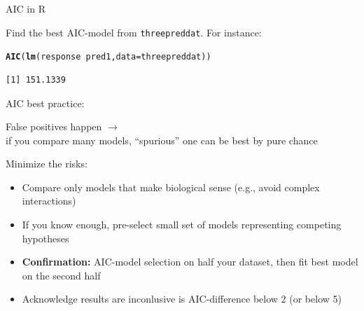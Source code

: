 \documentclass[10pt]{beamer}\usepackage[]{graphicx}\usepackage[]{color}
\makeatletter
\newcommand{\hlopt}[1]{\textcolor[rgb]{0,0,0}{#1}}%
\newcommand{\hlstd}[1]{\textcolor[rgb]{0.345,0.345,0.345}{#1}}%
\newcommand{\hlkwc}[1]{\textcolor[rgb]{0.333,0.667,0.333}{#1}}%
\newcommand{\hlkwd}[1]{\textcolor[rgb]{0.737,0.353,0.396}{\textbf{#1}}}%
\newenvironment{kframe}{%
 \def\at@end@of@kframe{}%
 \ifinner\ifhmode%
  \def\at@end@of@kframe{\end{minipage}}%
  \begin{minipage}{\columnwidth}%
 \fi\fi%
 \def\FrameCommand##1{\hskip\@totalleftmargin \hskip-\fboxsep
 \colorbox{shadecolor}{##1}\hskip-\fboxsep
     \hskip-\linewidth \hskip-\@totalleftmargin \hskip\columnwidth}%
 \MakeFramed {\advance\hsize-\width
   \@totalleftmargin\z@ \linewidth\hsize
   \@setminipage}}%
 {\par\unskip\endMakeFramed%
 \at@end@of@kframe}
\newenvironment{knitrout}{}{} %
\makeatother
\begin{document}
\begin{frame}[fragile]{AIC in R}

Find the best AIC-model from \texttt{threepreddat}. For instance:

\begin{knitrout}\small
{}\color{fgcolor}\begin{kframe}
\begin{alltt}
\hlkwd{AIC}\hlstd{(}\hlkwd{lm}\hlstd{(response} \hlopt{~} \hlstd{pred1,} \hlkwc{data} \hlstd{= threepreddat))}
\end{alltt}
\begin{verbatim}
[1] 151.1339
\end{verbatim}
\end{kframe}
\end{knitrout}

\end{frame}

\begin{frame}{AIC best practice:}
  
  False positives happen $\rightarrow$ \\ \hfill if you compare many models, ``spurious'' one can be best by pure chance
  
  \pause
  
  \begin{exampleblock}{Minimize the risks:}
  \begin{itemize}[<+->]
    \item Compare only models that make biological sense (e.g., avoid complex interactions)
    \item If you know enough, pre-select small set of models representing competing hypotheses
    \item \textbf{Confirmation:} AIC-model selection on half your dataset, then fit best model on the second half
    \item Acknowledge results are inconlusive is AIC-difference below 2 (or below 5)
  \end{itemize}
  \end{exampleblock}

\end{frame}
\end{document}
